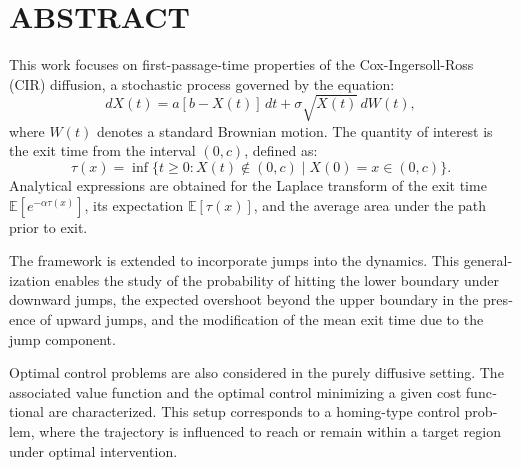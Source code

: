
\chapter*{ABSTRACT}\thispagestyle{headings}
%
\begin{otherlanguage}{english}
This work focuses on first-passage-time properties of the Cox-Ingersoll-Ross (CIR) diffusion, a stochastic process governed by the equation:
\[
dX(t) = a[b - X(t)]\,dt + \sigma \sqrt{X(t)}\,dW(t),
\]
where \(W(t)\) denotes a standard Brownian motion. The quantity of interest is the exit time from the interval \((0, c)\), defined as:
\[
\tau(x) = \inf\{ t \geq 0 : X(t) \notin (0, c) \mid X(0) = x \in (0, c) \}.
\]
Analytical expressions are obtained for the Laplace transform of the exit time \( \mathds{E}[e^{-\alpha \tau(x)}] \), its expectation \( \mathds{E}[\tau(x)] \), and the average area under the path prior to exit.

The framework is extended to incorporate jumps into the dynamics. This generalization enables the study of the probability of hitting the lower boundary under downward jumps, the expected overshoot beyond the upper boundary in the presence of upward jumps, and the modification of the mean exit time due to the jump component.

Optimal control problems are also considered in the purely diffusive setting. The associated value function and the optimal control minimizing a given cost functional are characterized. This setup corresponds to a homing-type control problem, where the trajectory is influenced to reach or remain within a target region under optimal intervention.

\end{otherlanguage}
